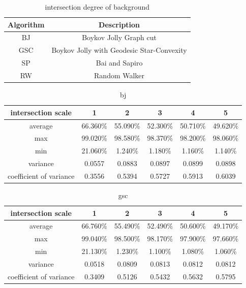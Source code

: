 \documentclass[runningheads,a4paper]{llncs}
\begin{document}
\begin{table}
\centering
\begin{tabular}{|c|c|}
\hline
Algorithm & Description\\
\hline
BJ &  Boykov Jolly Graph cut  \\
\hline
GSC & Boykov Jolly with Geodesic Star-Convexity \\
\hline
SP & Bai and Sapiro \\
\hline
RW & Random Walker  \\
\hline
\end{tabular}
\caption{intersection degree of background}
\end{table} 


\begin{table}
\centering
\begin{tabular}{|c|c|c|c|c|c|}
\hline
 intersection scale & 1 & 2 & 3 & 4& 5 \\
\hline
average& 66.360\% & 55.090\% & 52.300\% & 50.710\%& 49.620\% \\
\hline
max& 99.020\% & 98.580\% & 98.370\% & 98.200\%& 98.060\% \\
\hline
min& 21.060\% & 1.240\% & 1.180\% & 1.160\%& 1.140\%\\
\hline
variance& 0.0557 & 0.0883 & 0.0897 & 0.0899& 0.0898 \\
\hline
coefficient of variance& 0.3556 & 0.5394 & 0.5727 & 0.5913& 0.6039\\
\hline
\end{tabular}
\caption{bj}
\end{table} 

\begin{table}
\centering
\begin{tabular}{|c|c|c|c|c|c|}
\hline
intersection scale & 1 & 2 & 3 & 4& 5 \\
\hline
average& 66.760\% & 55.490\% & 52.490\% & 50.600\%& 49.170\% \\
\hline
max& 99.040\% & 98.500\% & 98.170\% & 97.900\%& 97.660\% \\
\hline
min& 21.130\% & 1.230\% & 1.100\% & 1.080\%& 1.060\%\\
\hline
variance& 0.0518 & 0.0809 & 0.0813 & 0.0812& 0.0812 \\
\hline
coefficient of variance& 0.3409 & 0.5126 & 0.5432 & 0.5632& 0.5795\\
\hline
\end{tabular}
\caption{gsc}
\end{table} 
\end{document}
